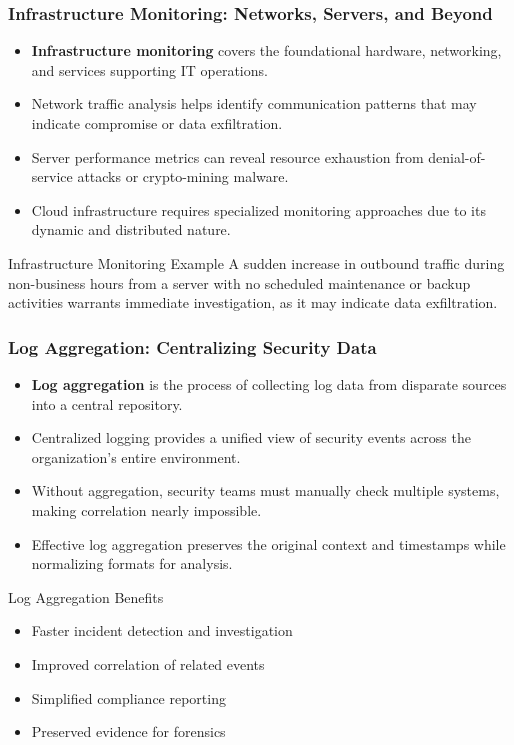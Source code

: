 \documentclass{beamer}
\begin{document}
\begin{frame}
\frametitle{Infrastructure Monitoring: Networks, Servers, and Beyond}
\begin{itemize}
\item \textbf{Infrastructure monitoring} covers the foundational hardware, networking, and services supporting IT operations.
\item Network traffic analysis helps identify communication patterns that may indicate compromise or data exfiltration.
\item Server performance metrics can reveal resource exhaustion from denial-of-service attacks or crypto-mining malware.
\item Cloud infrastructure requires specialized monitoring approaches due to its dynamic and distributed nature.
\end{itemize}

\begin{exampleblock}{Infrastructure Monitoring Example}
A sudden increase in outbound traffic during non-business hours from a server with no scheduled maintenance or backup activities warrants immediate investigation, as it may indicate data exfiltration.
\end{exampleblock}
\end{frame}
\begin{frame}
\frametitle{Log Aggregation: Centralizing Security Data}
\begin{itemize}
\item \textbf{Log aggregation} is the process of collecting log data from disparate sources into a central repository.
\item Centralized logging provides a unified view of security events across the organization's entire environment.
\item Without aggregation, security teams must manually check multiple systems, making correlation nearly impossible.
\item Effective log aggregation preserves the original context and timestamps while normalizing formats for analysis.
\end{itemize}

\begin{block}{Log Aggregation Benefits}
\begin{itemize}
\item Faster incident detection and investigation
\item Improved correlation of related events
\item Simplified compliance reporting
\item Preserved evidence for forensics
\end{itemize}
\end{block}
\end{frame}
\end{document}
